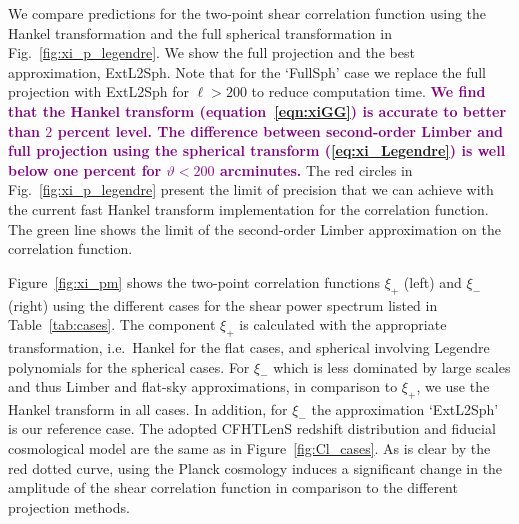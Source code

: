 \documentclass[fleqn,usenatbib]{mnras} %
\newcommand{\ch}[1]{\textcolor{purple}{\textbf{#1}}}
\begin{document}
We compare predictions for the two-point shear correlation function using
the Hankel transformation and the full spherical transformation in
Fig.~\ref{fig:xi_p_legendre}. We show the full projection and the best
approximation, ExtL2Sph. Note that for the `FullSph' case we replace the full
projection with ExtL2Sph for $\ell > 200$ to reduce computation time.
%
\ch{We find that the Hankel transform (equation~\ref{eqn:xiGG}) is accurate to better than $2$ percent level.
%
The difference between second-order Limber and full projection using the
spherical transform (\ref{eq:xi_Legendre}) is well below one percent
for $\vartheta < 200$ arcminutes.}
The red circles in Fig.~\ref{fig:xi_p_legendre} present the limit of
precision that we can achieve with the current fast Hankel transform implementation
for the correlation function. The green line shows the limit of the
second-order Limber approximation on the correlation function.

Figure~\ref{fig:xi_pm} shows the two-point correlation functions $\xi_+$ (left)
and $\xi_-$ (right) using the different cases for the shear power spectrum
listed in Table~\ref{tab:cases}. The component $\xi_+$ is calculated with the
appropriate transformation, i.e.~Hankel for the flat cases, and {spherical
involving Legendre polynomials} for the spherical cases. For $\xi_-$ which is
less dominated by large scales and thus Limber and flat-sky approximations, in
comparison to $\xi_+$, we use the Hankel transform in all cases. In addition,
for $\xi_-$ the approximation `ExtL2Sph' is our reference case. The adopted
CFHTLenS redshift distribution and fiducial cosmological model are the same as
in Figure~\ref{fig:Cl_cases}. As is clear by the red dotted curve, using the
Planck cosmology \citep{2015arXiv150201589P} induces a significant change in
the amplitude of the shear correlation function in comparison to the different
projection methods.
\end{document}
